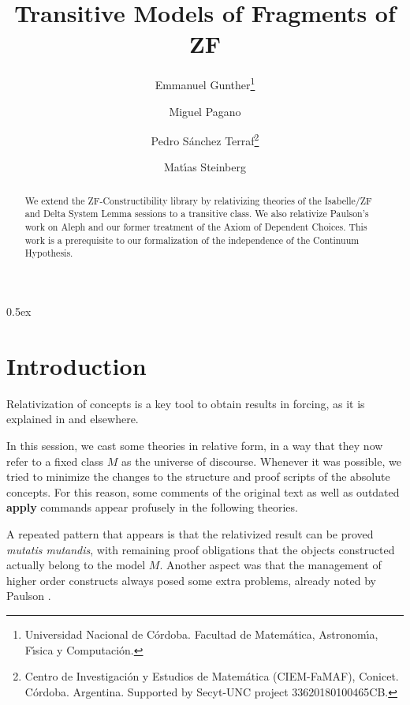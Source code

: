 \documentclass[11pt,a4paper]{article}
\begin{document}
\title{Transitive Models of Fragments of ZF}
\author{Emmanuel Gunther\thanks{Universidad Nacional de C\'ordoba.
    Facultad de Matem\'atica, Astronom\'{\i}a,  F\'{\i}sica y
    Computaci\'on.}
  \and
  Miguel Pagano\footnotemark[1]
  \and
  Pedro S\'anchez Terraf\footnotemark[1] \thanks{Centro de Investigaci\'on y Estudios de Matem\'atica
    (CIEM-FaMAF), Conicet. C\'ordoba. Argentina.
    Supported by Secyt-UNC project 33620180100465CB.}
  \and
  Mat\'{\i}as Steinberg\footnotemark[1]
}
\maketitle

\begin{abstract}
  We extend the ZF-Constructibility library by relativizing theories
  of the Isabelle/ZF and Delta System Lemma sessions to a transitive
  class. We also relativize Paulson's work on Aleph and our former
  treatment of the Axiom of Dependent Choices. This work is a
  prerequisite to our formalization of the independence of the
  Continuum Hypothesis.
\end{abstract}


\tableofcontents

\parindent 0pt\parskip 0.5ex

\section{Introduction}

Relativization of concepts is a key tool to obtain results in forcing,
as it is explained in \cite[Sect.~3]{2020arXiv200109715G} and elsewhere.

In this session, we cast some theories in relative form, in a
way that they now refer to a fixed class $M$ as the universe of
discourse. Whenever it was possible, we tried to minimize the changes
to the structure and proof scripts of the absolute concepts. For
this reason, some comments of the original text as well as
outdated \textbf{apply} commands appear profusely in the following
theories.

A repeated pattern that appears is that the relativized result can be
proved \emph{mutatis mutandis}, with remaining proof obligations that
the objects constructed actually belong to the model $M$. Another
aspect was that the management of higher order constructs always posed
some extra problems, already noted by Paulson \cite[Sect.~7.3]{MR2051585}.
\end{document}
